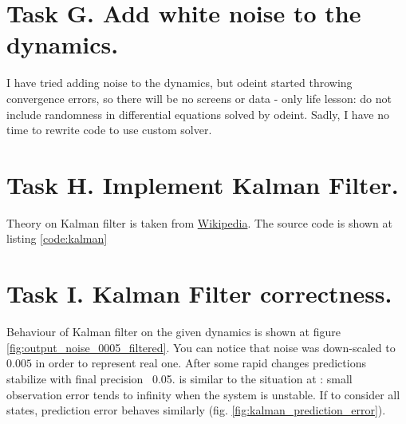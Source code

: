 \documentclass[12pt,letterpaper]{article}
\begin{document}
\section*{Task G. Add white noise to the dynamics.}
\label{Q:G}
    I have tried adding noise to the dynamics, but odeint started throwing convergence errors, so there will be no screens or data - only life lesson: do not include randomness in differential equations solved by odeint. Sadly, I have no time to rewrite code to use custom solver.

\section*{Task H. Implement Kalman Filter.}
\label{Q:H}
    Theory on Kalman filter is taken from \href{https://en.wikipedia.org/wiki/Kalman_filter}{Wikipedia}. The source code is shown at listing \ref{code:kalman}
    
    

\section*{Task I. Kalman Filter correctness.}
\label{Q:I}
    Behaviour of Kalman filter on the given dynamics is shown at figure \ref{fig:output_noise_0005_filtered}. You can notice that noise was down-scaled to $0.005$ in order to represent real one. After some rapid changes predictions stabilize with final precision ~0.05.  is similar to the situation at : small observation error tends to infinity when the system is unstable. If to consider all states, prediction error behaves similarly (fig. \ref{fig:kalman_prediction_error}).
    
\end{document}
